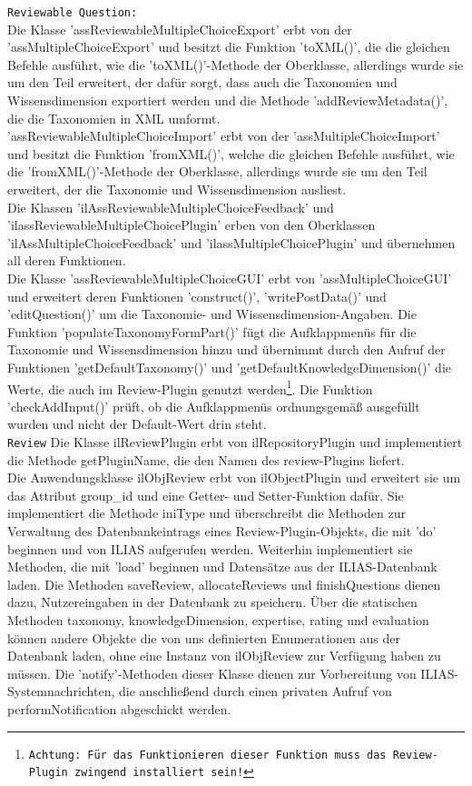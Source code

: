 \documentclass[a4paper]{scrreprt}
\begin{document}
\texttt{Reviewable Question:}\\
Die Klasse 'assReviewableMultipleChoiceExport' erbt von der 'assMultipleChoiceExport' und besitzt die Funktion 'toXML()', die die gleichen Befehle ausführt, wie die 'toXML()'-Methode der Oberklasse, allerdings wurde sie um den Teil erweitert, der dafür sorgt, dass auch die Taxonomien und Wissensdimension exportiert werden und die Methode 'addReviewMetadata()', die die Taxonomien in XML umformt.\\
'assReviewableMultipleChoiceImport' erbt von der 'assMultipleChoiceImport' und besitzt die Funktion 'fromXML()', welche die gleichen Befehle ausführt, wie die 'fromXML()'-Methode der Oberklasse, allerdings wurde sie um den Teil erweitert, der die Taxonomie und Wissensdimension ausliest.\\ 
Die Klassen 'ilAssReviewableMultipleChoiceFeedback' und 'ilassReviewableMultipleChoicePlugin' erben von den Oberklassen 'ilAssMultipleChoiceFeedback' und 'ilassMultipleChoicePlugin' und übernehmen all deren Funktionen.\\
Die Klasse 'assReviewableMultipleChoiceGUI' erbt von 'assMultipleChoiceGUI' und erweitert deren Funktionen '\textunderscore \textunderscore construct()', 'writePostData()' und 'editQuestion()' um die Taxonomie- und Wissensdimension-Angaben. Die Funktion 'populateTaxonomyFormPart()' fügt die Aufklappmenüs für die Taxonomie und Wissensdimension hinzu und übernimmt durch den Aufruf der Funktionen 'getDefaultTaxonomy()' und 'getDefaultKnowledgeDimension()' die Werte, die auch im Review-Plugin genutzt werden\footnote{\texttt{Achtung: Für das Funktionieren dieser Funktion muss das Review-Plugin zwingend installiert sein!}}. Die Funktion 'checkAddInput()' prüft, ob die Aufklappmenüs ordnungsgemäß ausgefüllt wurden und nicht der Default-Wert drin steht.\\
\texttt{Review}
Die Klasse ilReviewPlugin erbt von ilRepositoryPlugin und implementiert die Methode getPluginName, die den Namen des review-Plugins liefert.\\
Die Anwendungsklasse ilObjReview erbt von ilObjectPlugin und erweitert sie um das Attribut group_id und eine Getter- und Setter-Funktion dafür. Sie implementiert die Methode iniType und überschreibt die Methoden zur Verwaltung des Datenbankeintrags eines Review-Plugin-Objekts, die mit 'do' beginnen und von ILIAS aufgerufen werden. Weiterhin implementiert sie Methoden, die mit 'load' beginnen und Datensätze aus der ILIAS-Datenbank laden. Die Methoden saveReview, allocateReviews und finishQuestions dienen dazu, Nutzereingaben in der Datenbank zu speichern. Über die statischen Methoden taxonomy, knowledgeDimension, expertise, rating und evaluation können andere Objekte die von uns definierten Enumerationen aus der Datenbank laden, ohne eine Instanz von ilObjReview zur Verfügung haben zu müssen. Die 'notify'-Methoden dieser Klasse dienen zur Vorbereitung von ILIAS-Systemnachrichten, die anschließend durch einen privaten Aufruf von performNotification abgeschickt werden.\\
\end{document}
